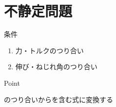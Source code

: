 \documentclass[a4paper]{jsarticle}
\begin{document}
\section{不静定問題}
\begin{itembox}[l]{条件}
    \begin{enumerate}[(1)]
        \item 力・トルクのつり合い
        \item 伸び・ねじれ角のつり合い
    \end{enumerate}
\end{itembox}
\begin{itembox}[l]{Point}
    \begin{center}
        のつり合いからを含む式に変換する
    \end{center}
\end{itembox}
\end{document}
